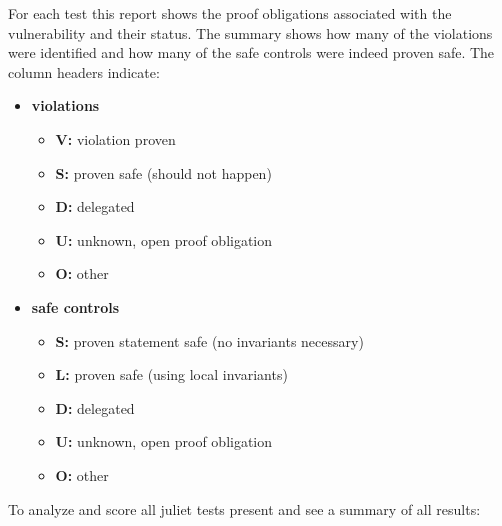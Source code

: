 \documentclass[11pt]{article}
\begin{document}
For each test this report shows the proof obligations associated with the
vulnerability and their status. The summary shows how many of the violations
were identified and how many of the safe controls were indeed proven safe.
The column headers indicate:
\begin{itemize}
\item {\bf violations}
  \begin{itemize}
  \item {\bf V:} violation proven
  \item {\bf S:} proven safe (should not happen)
  \item {\bf D:} delegated
  \item {\bf U:} unknown, open proof obligation
  \item {\bf O:} other
  \end{itemize}
\item {\bf safe controls}
  \begin{itemize}
  \item {\bf S:} proven statement safe (no invariants necessary)
  \item {\bf L:} proven safe (using local invariants)
  \item {\bf D:} delegated
  \item {\bf U:} unknown, open proof obligation
  \item {\bf O:} other
  \end{itemize}
\end{itemize}

To analyze and score all juliet tests present and see a summary of all results:
\end{document}
